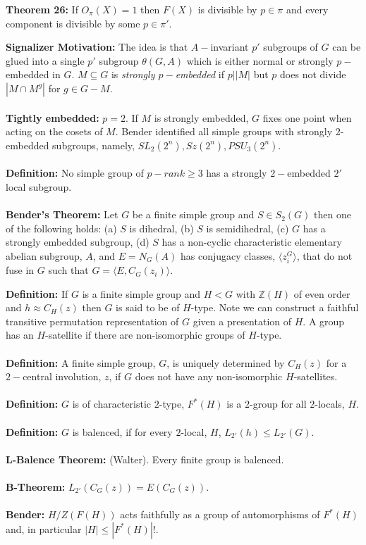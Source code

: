 {\bf Theorem 26:}
If $O_{\pi}(X)=1$ then $F(X)$ is divisible by $p \in \pi$ and every component is
divisible by some $p \in \pi'$.
\begin{quote}
\end{quote}
{\bf Signalizer Motivation:}  The idea is that
$A-$invariant $p'$ subgroups of $G$ can be glued into a single $p'$
subgroup $\theta(G,A)$ which is either normal or strongly $p-$embedded in $G$.
$M \subseteq G$ is \emph{ strongly $p-$embedded} if $p | |M|$ but $p$ does not divide
$|M \cap M^g |$ for $g \in G-M$.
\\
\\
{\bf Tightly embedded:} $p=2$. If $M$ is strongly
embedded, $G$ fixes one point when acting on the cosets of $M$.
Bender identified all simple groups with strongly 2-embedded subgroups, namely,
$SL_2(2^n), Sz(2^n), PSU_3(2^n)$.
\\
\\
{\bf Definition:}
No simple group of
$p-rank \ge 3$ has a strongly $2-$embedded $2'$ local subgroup.\\
\\
{\bf Bender's Theorem:} Let $G$ be a finite simple group and $S \in S_2(G)$ then one of the following holds:
(a) $S$ is dihedral, (b) $S$ is semidihedral, (c) $G$ has a strongly embedded subgroup,
(d) $S$ has a non-cyclic characteristic elementary abelian subgroup, $A$, and
$E=N_G(A)$ has conjugacy classes, $ \langle z_i^G \rangle $, that do not fuse in $G$ such that
$G= \langle E, C_G(z_i ) \rangle $.
\begin{quote}
\end{quote}
{\bf Definition:}
If $G$ is a finite simple group and
$H<G$ with ${\mathbb Z}(H)$ of even order and $h \approx C_H(z)$ then $G$ is said
to be of $H$-type.  Note we can construct a faithful transitive permutation representation
of $G$ given a presentation of $H$.  A group has an $H$-satellite if there are non-isomorphic
groups of $H$-type.
\\
\\
{\bf Definition:}
A finite simple group, $G$, is uniquely determined by $C_H(z)$ for a $2-$central
involution, $z$, if $G$ does not have any non-isomorphic $H$-satellites.
\\
\\
{\bf Definition:} $G$ is of characteristic $2$-type, $F^*(H)$ is a $2$-group for all $2$-locals,
$H$.
\\
\\
{\bf Definition:} $G$ is balenced, if for every $2$-local, $H$, $L_{2'}(h) \leq  L_{2'}(G)$.
\\
\\
{\bf L-Balence Theorem:} (Walter). Every finite group is balenced.
\\
\\
{\bf B-Theorem:} $L_{2'}(C_G(z)) = E(C_G(z))$.
\\
\\
{\bf Bender:} $H/Z(F(H))$ acts faithfully as a group of automorphisms of $F^*(H)$ and, in particular $|H| \leq |F^*(H)|!$.

